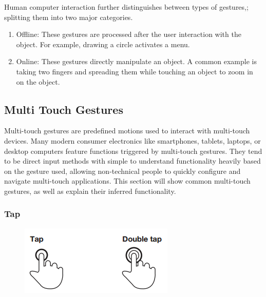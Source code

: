 \documentclass[11pt]{report}
\begin{document}
Human computer interaction further distinguishes between types of gestures,; splitting them into two major categories.

\begin{enumerate}

\item Offline: These gestures are processed after the user interaction with the object. For example, drawing a circle activates a menu.

\item Online: These gestures directly manipulate an object. A common example is taking two fingers and spreading them while touching an object to zoom in on the object.
\end{enumerate} 



\subsection{Multi Touch Gestures}

Multi-touch gestures are predefined motions used to interact with multi-touch devices.
Many modern consumer electronics like smartphones, tablets, laptops, or desktop computers feature functions triggered by multi-touch gestures.
They tend to be direct input methods with simple to understand functionality heavily based on the gesture used, allowing non-technical people to quickly configure and navigate multi-touch applications.
This section will show common multi-touch gestures, as well as explain their inferred functionality.

\subsubsection{Tap}

\begin{figure}
\includegraphics[width=\textwidth]{Taps}
\end{figure}
\end{document}
